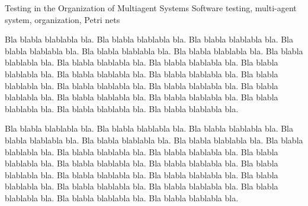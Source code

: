 \begin{englishabstract}%
  {Testing in the Organization of Multiagent Systems}%
  {Software testing, multi-agent system, organization, Petri nets}

  Bla blabla blablabla bla.  Bla blabla blablabla bla.  Bla blabla blablabla
  bla.  Bla blabla blablabla bla.  Bla blabla blablabla bla.  Bla blabla
  blablabla bla.  Bla blabla blablabla bla.  Bla blabla blablabla bla.  Bla
  blabla blablabla bla.  Bla blabla blablabla bla.  Bla blabla blablabla bla.
  Bla blabla blablabla bla.  Bla blabla blablabla bla.  Bla blabla blablabla
  bla.  Bla blabla blablabla bla.  Bla blabla blablabla bla.  Bla blabla
  blablabla bla.  Bla blabla blablabla bla.  Bla blabla blablabla bla.  Bla
  blabla blablabla bla.  Bla blabla blablabla bla.

  Bla blabla blablabla bla.  Bla blabla blablabla bla.  Bla blabla blablabla
  bla.  Bla blabla blablabla bla.  Bla blabla blablabla bla.  Bla blabla
  blablabla bla.  Bla blabla blablabla bla.  Bla blabla blablabla bla.  Bla
  blabla blablabla bla.  Bla blabla blablabla bla.  Bla blabla blablabla bla.
  Bla blabla blablabla bla.  Bla blabla blablabla bla.  Bla blabla blablabla
  bla.  Bla blabla blablabla bla.  Bla blabla blablabla bla.  Bla blabla
  blablabla bla.  Bla blabla blablabla bla.  Bla blabla blablabla bla.  Bla
  blabla blablabla bla.  Bla blabla blablabla bla.
\end{englishabstract}